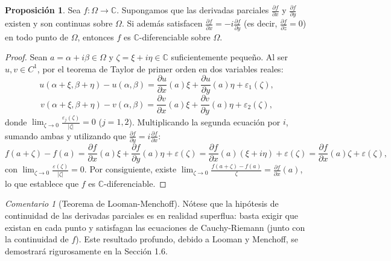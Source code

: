 \documentclass[11pt,a4paper]{article}
\theoremstyle{definition}
\newtheorem{proposicion}{Proposición}[section]
\theoremstyle{remark}
\newtheorem{observacion}{Comentario}[section]
\numberwithin{equation}{section}
\begin{document}
\begin{proposicion}
Sea $f: \Omega \to \mathbb{C}$. Supongamos que las derivadas parciales $\frac{\partial f}{\partial x}$ y $\frac{\partial f}{\partial y}$ existen y son continuas sobre $\Omega$. Si además satisfacen $\frac{\partial f}{\partial x} = -i\frac{\partial f}{\partial y}$ (es decir, $\frac{\partial f}{\partial \bar{z}} = 0$) en todo punto de $\Omega$, entonces $f$ es $\mathbb{C}$-diferenciable sobre $\Omega$.
\end{proposicion}
\begin{proof}
Sean $a = \alpha + i\beta \in \Omega$ y $\zeta = \xi + i\eta \in \mathbb{C}$ suficientemente pequeño. Al ser $u, v \in C^1$, por el teorema de Taylor de primer orden en dos variables reales:
\[
u(\alpha+\xi, \beta+\eta) - u(\alpha,\beta) = \frac{\partial u}{\partial x}(a)\xi + \frac{\partial u}{\partial y}(a)\eta + \varepsilon_1(\zeta),
\]
\[
v(\alpha+\xi, \beta+\eta) - v(\alpha,\beta) = \frac{\partial v}{\partial x}(a)\xi + \frac{\partial v}{\partial y}(a)\eta + \varepsilon_2(\zeta),
\]
donde $\lim_{\zeta \to 0} \frac{\varepsilon_j(\zeta)}{|\zeta|} = 0$ ($j=1,2$). Multiplicando la segunda ecuación por $i$, sumando ambas y utilizando que $\frac{\partial f}{\partial y} = i\frac{\partial f}{\partial x}$:
\[
f(a+\zeta) - f(a) = \frac{\partial f}{\partial x}(a)\xi + \frac{\partial f}{\partial y}(a)\eta + \varepsilon(\zeta) = \frac{\partial f}{\partial x}(a)(\xi + i\eta) + \varepsilon(\zeta) = \frac{\partial f}{\partial x}(a)\zeta + \varepsilon(\zeta),
\]
con $\lim_{\zeta \to 0} \frac{\varepsilon(\zeta)}{|\zeta|} = 0$. Por consiguiente, existe $\lim_{\zeta \to 0} \frac{f(a+\zeta)-f(a)}{\zeta} = \frac{\partial f}{\partial x}(a)$, lo que establece que $f$ es $\mathbb{C}$-diferenciable.
\end{proof}

\begin{observacion}[Teorema de Looman-Menchoff]
Nótese que la hipótesis de continuidad de las derivadas parciales es en realidad superflua: basta exigir que existan en cada punto y satisfagan las ecuaciones de Cauchy-Riemann (junto con la continuidad de $f$). Este resultado profundo, debido a Looman y Menchoff, se demostrará rigurosamente en la Sección 1.6.
\end{observacion}
\end{document}
